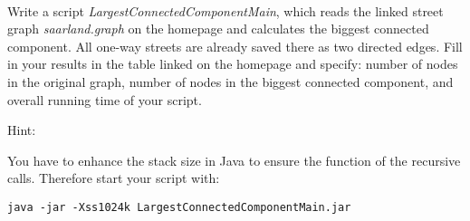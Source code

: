  \\
Write a script \emph{LargestConnectedComponentMain}, which reads the linked 
street graph \emph{saarland.graph} on the homepage and calculates the biggest 
connected component. All one-way streets are already saved there as two 
directed edges. Fill in your results in the table linked on the homepage and 
specify: number of nodes in the original graph, number of nodes in the biggest 
connected component, and overall running time of your script.

Hint:

You have to enhance the stack size in Java to ensure the function of the 
recursive calls. Therefore start your script with:

\begin{verbatim}
java -jar -Xss1024k LargestConnectedComponentMain.jar
\end{verbatim}